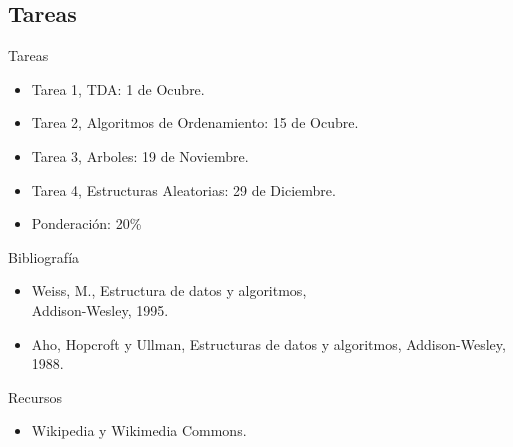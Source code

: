 \documentclass{beamer} %
\begin{document}
\subsection{Tareas}
\begin{frame}
  \begin{block}{Tareas}
  \begin{itemize}
    \item Tarea 1, TDA: 1 de Ocubre.
    \item Tarea 2, Algoritmos de Ordenamiento: 15 de Ocubre.
    \item Tarea 3, Arboles: 19 de Noviembre.
    \item Tarea 4, Estructuras Aleatorias: 29 de Diciembre.
  \end{itemize}
  \begin{itemize}
    \item Ponderación: 20\%
  \end{itemize}
\end{block}
\end{frame}



\begin{frame}
 \begin{block}{Bibliografía}
  \begin{itemize}
    \item Weiss, M., Estructura de datos y algoritmos,\\ Addison-Wesley, 1995.
    \item Aho, Hopcroft y Ullman, Estructuras de datos y algoritmos, Addison-Wesley, 1988.
  \end{itemize}
 \end{block}
 \begin{block}{Recursos}
  \begin{itemize}
    \item Wikipedia y Wikimedia Commons.
  \end{itemize}
 \end{block}
\end{frame}
\end{document}

